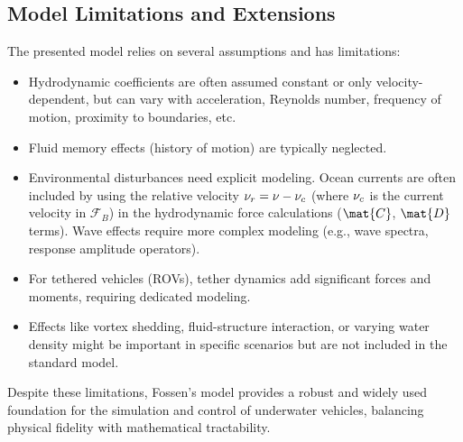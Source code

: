 \subsection{Model Limitations and Extensions}
The presented model relies on several assumptions and has limitations:
\begin{itemize}
    \item Hydrodynamic coefficients are often assumed constant or only velocity-dependent, but can vary with acceleration, Reynolds number, frequency of motion, proximity to boundaries, etc.
    \item Fluid memory effects (history of motion) are typically neglected.
    \item Environmental disturbances need explicit modeling. Ocean currents are often included by using the relative velocity $\mathbf{\nu}_r = \mathbf{\nu} - \mathbf{\nu}_c$ (where $\mathbf{\nu}_c$ is the current velocity in $\mathcal{F}_B$) in the hydrodynamic force calculations ($\mat{C}$, $\mat{D}$ terms). Wave effects require more complex modeling (e.g., wave spectra, response amplitude operators).
    \item For tethered vehicles (ROVs), tether dynamics add significant forces and moments, requiring dedicated modeling.
    \item Effects like vortex shedding, fluid-structure interaction, or varying water density might be important in specific scenarios but are not included in the standard model.
\end{itemize}
Despite these limitations, Fossen's model provides a robust and widely used foundation for the simulation and control of underwater vehicles, balancing physical fidelity with mathematical tractability.

